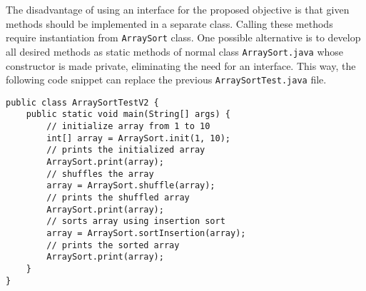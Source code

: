 \documentclass[12pt,letterpaper,twoside]{article}
\begin{document}
\begin{enumerate}
The disadvantage of using an interface for the proposed objective is that given methods should be implemented in a separate class. Calling these methods require instantiation from \texttt{ArraySort} class. One possible alternative is to develop all desired methods as static methods of normal class \texttt{ArraySort.java} whose constructor is made private, eliminating the need for an interface. This way, the following code snippet can replace the previous \texttt{ArraySortTest.java} file.

\lstset{language=java,tabsize=2}
\begin{lstlisting}
public class ArraySortTestV2 {
	public static void main(String[] args) {
		// initialize array from 1 to 10
		int[] array = ArraySort.init(1, 10);
		// prints the initialized array
		ArraySort.print(array);
		// shuffles the array
		array = ArraySort.shuffle(array);
		// prints the shuffled array
		ArraySort.print(array);
		// sorts array using insertion sort
		array = ArraySort.sortInsertion(array);
		// prints the sorted array
		ArraySort.print(array);
	}
}
\end{lstlisting}

\end{enumerate}
\end{document}
